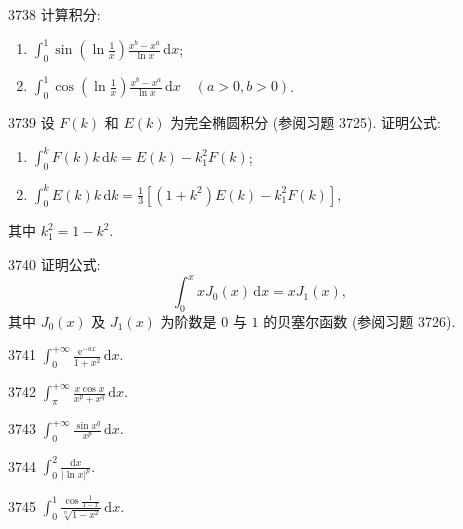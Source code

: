 \begin{prob}[M]{3738}
计算积分:
\begin{enumerate}[label=(\alph*), itemsep=2pt, topsep=3pt]
\item $\displaystyle \int_0^1 \sin\left(\ln \frac{1}{x}\right) \frac{x^b - x^a}{\ln x} \,\mathrm{d}x$;
\item $\displaystyle \int_0^1 \cos\left(\ln \frac{1}{x}\right) \frac{x^b - x^a}{\ln x} \,\mathrm{d}x \quad (a > 0, b > 0)$.
\end{enumerate}
\end{prob}

\begin{prob}[M]{3739}
设 $F(k)$ 和 $E(k)$ 为完全椭圆积分 (参阅习题 3725). 证明公式:
\begin{enumerate}[label=(\alph*), itemsep=2pt, topsep=3pt]
\item $\displaystyle \int_0^k F(k) k \,\mathrm{d}k = E(k) - k_1^2 F(k)$;
\item $\displaystyle \int_0^k E(k) k \,\mathrm{d}k = \frac{1}{3} [(1 + k^2) E(k) - k_1^2 F(k)]$,
\end{enumerate}
其中 $k_1^2 = 1 - k^2$.
\end{prob}

\begin{prob}[M]{3740}
证明公式:
\[
\int_0^x x J_0(x) \,\mathrm{d}x = x J_1(x),
\]
其中 $J_0(x)$ 及 $J_1(x)$ 为阶数是 $0$ 与 $1$ 的贝塞尔函数 (参阅习题 3726).
\end{prob}



\begin{prob}[S]{3741}
$\int_{0}^{+\infty} \frac{\mathrm{e}^{-ax}}{1+x^2}\,\mathrm{d}x$.
\end{prob}

\begin{prob}[S]{3742}
$\int_{\pi}^{+\infty} \frac{x\cos x}{x^p + x^q}\,\mathrm{d}x$.
\end{prob}

\begin{prob}[S]{3743}
$\int_{0}^{+\infty} \frac{\sin x^q}{x^p}\,\mathrm{d}x$.
\end{prob}

\begin{prob}[S]{3744}
$\int_{0}^{2} \frac{\mathrm{d}x}{|\ln x|^p}$.
\end{prob}

\begin{prob}[S]{3745}
$\int_{0}^{1} \frac{\cos \frac{1}{1-x}}{\sqrt[n]{1-x^2}}\,\mathrm{d}x$.
\end{prob}

